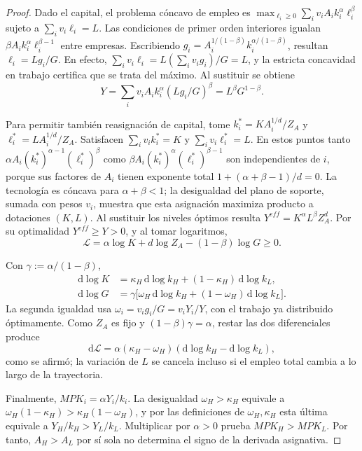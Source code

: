 \begin{proof}
Dado el capital, el problema cóncavo de empleo es
$\max_{\ell_i\geq0}\sum_i v_iA_i k_i^\alpha\ell_i^\beta$
sujeto a $\sum_i v_i\ell_i=L$.
Las condiciones de primer orden interiores igualan
$\beta A_i k_i^\alpha\ell_i^{\beta-1}$ entre empresas.
Escribiendo $g_i=A_i^{1/(1-\beta)}
k_i^{\alpha/(1-\beta)}$, resultan
$\ell_i=Lg_i/G$. En efecto,
$\sum_i v_i\ell_i=L(\sum_i v_i g_i)/G=L$,
y la estricta concavidad en trabajo certifica
que se trata del máximo. Al sustituir se obtiene
\[
Y=\sum_i v_iA_i k_i^\alpha (Lg_i/G)^\beta
=L^\beta G^{1-\beta}.
\]

Para permitir también reasignación de capital, tome
$k_i^*=K A_i^{1/d}/Z_A$ y
$\ell_i^*=L A_i^{1/d}/Z_A$. Satisfacen
$\sum_i v_i k_i^*=K$ y $\sum_i v_i\ell_i^*=L$.
En estos puntos tanto
$\alpha A_i(k_i^*)^{\alpha-1}(\ell_i^*)^\beta$
como
$\beta A_i(k_i^*)^\alpha(\ell_i^*)^{\beta-1}$
son independientes de $i$, porque sus factores
de $A_i$ tienen exponente total
$1+(\alpha+\beta-1)/d=0$.
La tecnología es cóncava para
$\alpha+\beta<1$; la desigualdad del plano de soporte,
sumada con pesos $v_i$, muestra que esta asignación
maximiza producto a dotaciones $(K,L)$.
Al sustituir los niveles óptimos resulta
$Y^{eff}=K^\alpha L^\beta Z_A^d$.
Por su optimalidad $Y^{eff}\geq Y>0$, y al tomar
logaritmos,
\[
\mathscr L=\alpha\log K+d\log Z_A
-(1-\beta)\log G\geq0.
\]

Con $\gamma:=\alpha/(1-\beta)$,
\begin{align*}
\mathrm d\log K&=\kappa_H\,\mathrm d\log k_H+
(1-\kappa_H)\,\mathrm d\log k_L,\\
\mathrm d\log G&=\gamma\big[
\omega_H\,\mathrm d\log k_H+
(1-\omega_H)\,\mathrm d\log k_L\big].
\end{align*}
La segunda igualdad usa
$\omega_i=v_i g_i/G=v_iY_i/Y$,
con el trabajo ya distribuido óptimamente.
Como $Z_A$ es fijo y $(1-\beta)\gamma=\alpha$,
restar las dos diferenciales produce
\[
\mathrm d\mathscr L=
\alpha(\kappa_H-\omega_H)
(\mathrm d\log k_H-\mathrm d\log k_L),
\]
como se afirmó; la variación de $L$ se cancela
incluso si el empleo total cambia a lo largo de
la trayectoria.

Finalmente, $MPK_i=\alpha Y_i/k_i$.
La desigualdad $\omega_H>\kappa_H$ equivale a
$\omega_H(1-\kappa_H)>
\kappa_H(1-\omega_H)$, y por las
definiciones de $\omega_H,\kappa_H$ esta última
equivale a $Y_H/k_H>Y_L/k_L$.
Multiplicar por $\alpha>0$ prueba
$MPK_H>MPK_L$. Por tanto, $A_H>A_L$
por sí sola no determina el signo de la
derivada asignativa.
\end{proof}

